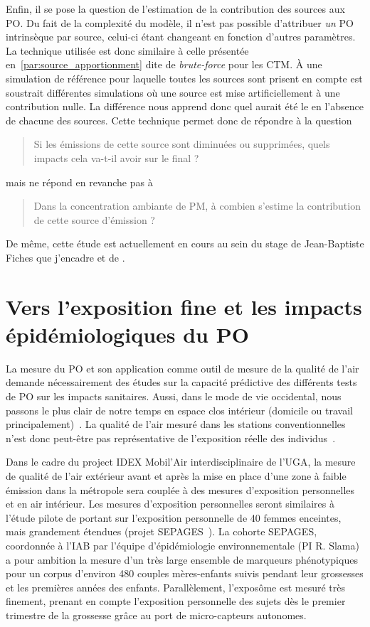 Enfin, il se pose la question de l'estimation de la contribution des sources aux PO. Du
fait de la complexité du modèle, il n'est pas possible d'attribuer \emph{un} PO
intrinsèque par source, celui-ci étant changeant en fonction d'autres paramètres.
La technique utilisée est donc similaire à celle présentée
en~\ref{par:source_apportionment} dite de \textit{brute-force} pour les CTM. À une
simulation de référence pour laquelle toutes les sources sont prisent en compte est
soustrait différentes simulations où une source est mise artificiellement à une
contribution nulle.  La différence nous apprend donc quel aurait été le \POv{} en
l'absence de chacune des sources.
Cette technique permet donc de répondre à la question
\begin{quote}
   Si les émissions de cette source sont diminuées ou supprimées, quels impacts cela va-t-il
   avoir sur le \POv{} final ?
\end{quote}
mais ne répond en revanche pas à
\begin{quote}
   Dans la concentration ambiante de PM, à combien s'estime la contribution de cette source
   d'émission ?
\end{quote}

De même, cette étude est actuellement en cours au sein du stage de Jean-Baptiste Fiches
que j'encadre et de \cite{borlazaUrbaninprep.}.

\section{Vers l'exposition fine et les impacts épidémiologiques du PO}

La mesure du PO et son application comme outil de mesure de la qualité de l'air demande
nécessairement des études sur la capacité prédictive des différents tests de PO sur les impacts sanitaires.
Aussi, dans le mode de vie occidental, nous passons le plus clair de notre temps en espace
clos intérieur (domicile ou travail
principalement)~\autocite{netheryTime2009,ouidirEstimation2015}. La qualité de l'air
mesuré dans les stations conventionnelles n'est donc peut-être pas représentative de
l'exposition réelle des individus~\autocite{sauvainOxidative2015}.

Dans le cadre du project IDEX Mobil'Air interdisciplinaire de l'UGA, la mesure de qualité
de l'air extérieur avant et après la mise en place d'une zone à faible émission dans la
métropole sera couplée à des mesures d'exposition personnelles et en air intérieur. Les mesures
d'exposition personnelles seront similaires à l'étude pilote de \cite{ouidirEstimation2015}
portant sur l'exposition personnelle de 40 femmes enceintes, mais grandement étendues (projet
SEPAGES~\autocite{lyon-caenDeciphering2019}). La cohorte SEPAGES, coordonnée à l'IAB par l'équipe d'épidémiologie environnementale (PI R. Slama) a pour ambition la mesure d'un très large
ensemble de marqueurs phénotypiques pour un corpus d'environ 480 couples mères-enfants
suivis pendant leur grossesses et les premières années des enfants. Parallèlement,
l'exposôme est mesuré très finement, prenant en compte l'exposition personnelle des
sujets dès le premier trimestre de la grossesse grâce au port de micro-capteurs autonomes.

